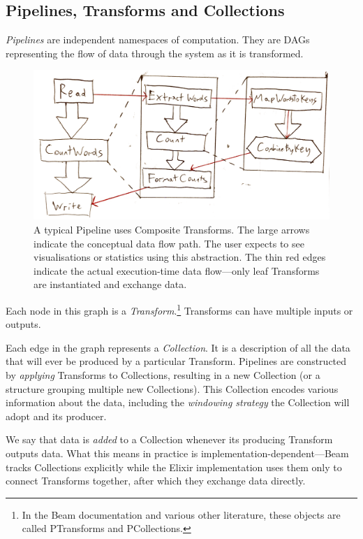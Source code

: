 \subsection{Pipelines, Transforms and Collections}\label{sec:impl:dataflow:pipelines-transforms-collections}

\emph{Pipelines} are independent namespaces of computation.
They are DAGs representing the flow of data through the system as it is transformed.

\begin{figure}[t]
	\includegraphics[width=\textwidth]{images/temp/composite-example}
	\caption[An illustration of the function of Composite Transforms in a typical Pipeline.]{A typical Pipeline uses Composite Transforms. The large arrows indicate the conceptual data flow path. The user expects to see visualisations or statistics using this abstraction. The thin red edges indicate the actual execution-time data flow---only leaf Transforms are instantiated and exchange data.}
	\label{fig:impl:composite-transforms}
\end{figure}

Each node in this graph is a \emph{Transform}.\footnote
{
In the Beam documentation and various other literature, these objects are called PTransforms and PCollections.
}
Transforms can have multiple inputs or outputs.

Each edge in the graph represents a \emph{Collection}.
It is a description of all the data that will ever be produced by a particular Transform.
Pipelines are constructed by \emph{applying} Transforms to Collections, resulting in a new Collection (or a structure grouping multiple new Collections).
This Collection encodes various information about the data, including the \emph{windowing strategy} the Collection will adopt and its producer.

We say that data is \emph{added} to a Collection whenever its producing Transform outputs data.
What this means in practice is implementation-dependent---Beam tracks Collections explicitly while the Elixir implementation uses them only to connect Transforms together, after which they exchange data directly.


